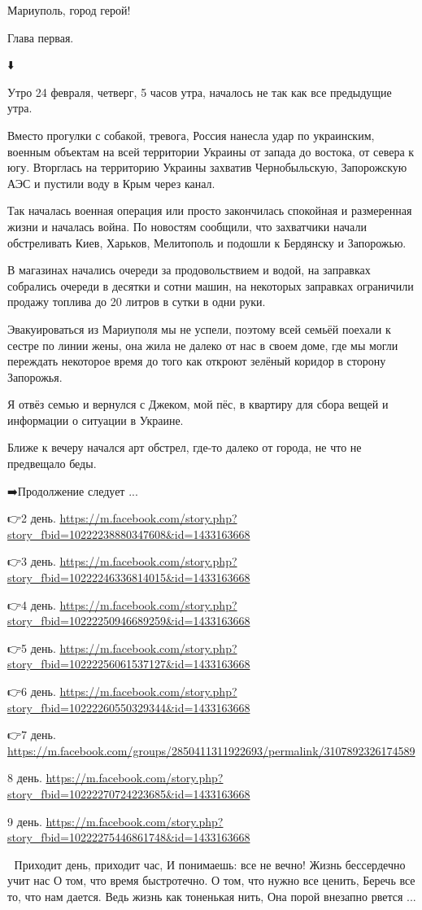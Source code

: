 Мариуполь, город герой!

Глава первая.

⬇️

Утро 24 февраля, четверг, 5 часов утра, началось не так как все предыдущие
утра.

Вместо прогулки с собакой,  тревога, Россия нанесла удар по украинским, военным
объектам на всей территории Украины от запада до востока, от севера к югу.
Вторглась на территорию Украины захватив Чернобыльскую, Запорожскую АЭС и
пустили воду в Крым через канал.

Так началась военная операция или просто закончилась спокойная и размеренная
жизни и началась война. По новостям сообщили, что захватчики начали
обстреливать Киев, Харьков, Мелитополь и подошли к  Бердянску и Запорожью.

В магазинах начались очереди за продовольствием и водой, на заправках собрались
очереди в  десятки и сотни машин, на некоторых заправках ограничили продажу
топлива до 20 литров в сутки в одни руки.

Эвакуироваться из Мариуполя мы не успели, поэтому всей семьёй поехали к
сестре по линии жены, она жила не далеко от нас в своем доме, где мы могли
переждать некоторое время до того как откроют зелёный коридор в сторону
Запорожья.

Я отвёз семью и вернулся с Джеком, мой пёс, в  квартиру для сбора вещей и
информации о ситуации в Украине.

Ближе к вечеру начался арт обстрел, где-то далеко от города, не что не
предвещало беды.

➡️Продолжение следует ...

👉2 день.
\url{https://m.facebook.com/story.php?story_fbid=10222238880347608&id=1433163668}

👉3 день.
\url{https://m.facebook.com/story.php?story_fbid=10222246336814015&id=1433163668}

👉4 день. 
\url{https://m.facebook.com/story.php?story_fbid=10222250946689259&id=1433163668}

👉5 день.
\url{https://m.facebook.com/story.php?story_fbid=10222256061537127&id=1433163668}

👉6 день.
\url{https://m.facebook.com/story.php?story_fbid=10222260550329344&id=1433163668}

👉7 день.
\url{https://m.facebook.com/groups/2850411311922693/permalink/3107892326174589}

8 день. \url{https://m.facebook.com/story.php?story_fbid=10222270724223685&id=1433163668}

9 день.
\url{https://m.facebook.com/story.php?story_fbid=10222275446861748&id=1433163668}

🙏
\obeycr
Приходит день, приходит час,
И понимаешь: все не вечно!
Жизнь бессердечно учит нас
О том, что время быстротечно.
О том, что нужно все ценить,
Беречь все то, что нам дается.
Ведь жизнь как тоненькая нить,
Она порой внезапно рвется ...
\restorecr

